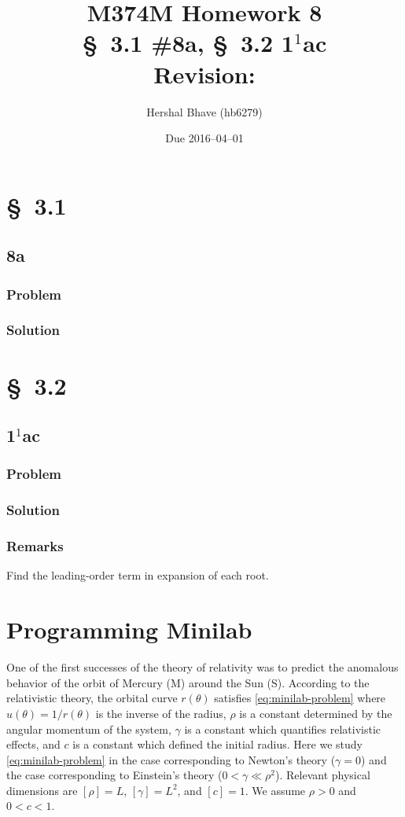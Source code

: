 \documentclass[12pt,twoside]{article}
\title{M374M Homework 8 \\
  \normalsize{\S~3.1 \#8a, \S~3.2 1$^1$ac} \\
  Revision: }
\author{Hershal Bhave (hb6279)}
\date{Due 2016--04--01}
\begin{document}
\maketitle

\section{\S~3.1}
\subsection{8a}
\subsubsection*{Problem}
\subsubsection*{Solution}

\section{\S~3.2}
\subsection{1$^1$ac}
\subsubsection*{Problem}
\subsubsection*{Solution}
\subsubsection*{Remarks}
Find the leading-order term in expansion of each root.

\section{Programming Minilab}
One of the first successes of the theory of relativity was to predict the
anomalous behavior of the orbit of Mercury (M) around the Sun (S). According to
the relativistic theory, the orbital curve $r(\theta)$ satisfies
\cref{eq:minilab-problem} where $u(\theta)=1/r(\theta)$ is the inverse of the
radius, $\rho$ is a constant determined by the angular momentum of the system,
$\gamma$ is a constant which quantifies relativistic effects, and $c$ is a
constant which defined the initial radius. Here we study
\cref{eq:minilab-problem} in the case corresponding to Newton's theory
($\gamma=0$) and the case corresponding to Einstein's theory
($0<\gamma\ll\rho^2$). Relevant physical dimensions are $[\rho]=L$,
$[\gamma]=L^2$, and $[c]=1$. We assume $\rho>0$ and $0<c<1$.
\end{document}
